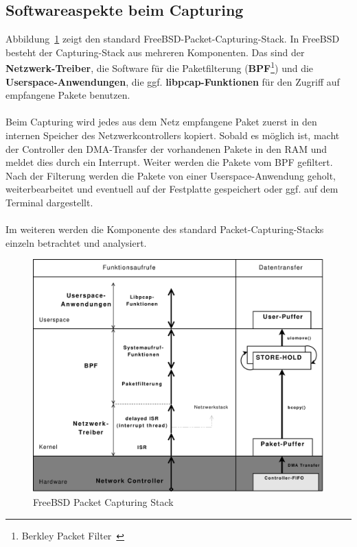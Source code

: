 \subsection{Softwareaspekte beim Capturing}\label{subsec:sw_cap}
Abbildung~\ref{bsd_cap_stack} zeigt den standard
FreeBSD-Packet-Capturing-Stack.  In FreeBSD besteht der Capturing-Stack aus
mehreren Komponenten.  Das sind der \textbf{Netzwerk-Treiber}, die Software für
die Paketfilterung (\textbf{BPF}\footnote{Berkley Packet Filter~\cite{bpf_wiki,
man_bpf, man_kernel_bpf}}) und die \textbf{Userspace-Anwendungen}, die ggf.
\textbf{libpcap-Funktionen} für den Zugriff auf empfangene Pakete benutzen.\\\\
%
Beim Capturing wird jedes aus dem Netz empfangene Paket zuerst in den internen
Speicher des Netzwerkcontrollers kopiert. Sobald es möglich ist, macht der
Controller den DMA-Transfer der vorhandenen Pakete in den RAM und meldet dies
durch ein Interrupt. Weiter werden die Pakete vom BPF gefiltert. Nach der
Filterung werden die Pakete von einer Userspace-Anwendung geholt,
weiterbearbeitet und eventuell auf der Festplatte gespeichert oder ggf.  auf
dem Terminal dargestellt.\\\\
%
Im weiteren werden die Komponente des standard Packet-Capturing-Stacks einzeln 
betrachtet und analysiert.


\begin{figure}
\centering \includegraphics[width=5.1in]{bilder/3copy}
\caption{FreeBSD Packet Capturing Stack}
\label{bsd_cap_stack}
\end{figure}
%
